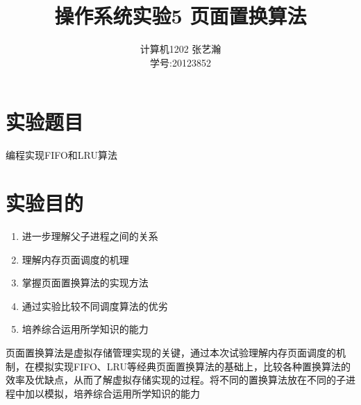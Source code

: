 \documentclass[11pt]{article}
\begin{document}
\title{操作系统实验5 \quad 页面置换算法}
\author{计算机1202 \quad 张艺瀚\\学号:20123852}
\maketitle

\thispagestyle{fancy}
\normalsize 


\section{实验题目}
编程实现FIFO和LRU算法

\section{实验目的}
\begin{enumerate}
\item 进一步理解父子进程之间的关系 
\item 理解内存页面调度的机理 
\item 掌握页面置换算法的实现方法 
\item 通过实验比较不同调度算法的优劣 
\item 培养综合运用所学知识的能力
\end{enumerate}

页面置换算法是虚拟存储管理实现的关键，通过本次试验理解内存页面调度的机制，在模拟实现FIFO、LRU等经典页面置换算法的基础上，比较各种置换算法的效率及优缺点，从而了解虚拟存储实现的过程。将不同的置换算法放在不同的子进程中加以模拟，培养综合运用所学知识的能力
\end{document}
